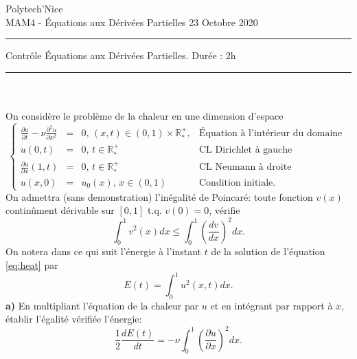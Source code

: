 \documentclass[12pt,a4paper]{article}
\begin{document}
 \hfill Polytech'Nice\\
\noindent MAM4 - \'Equations aux D\'eriv\'ees Partielles \hfill 
23 Octobre 2020 \\

\hrule

\vspace{0.6cm}
\centerline {\large \sc Contrôle \'Equations aux D\'eriv\'ees Partielles. Dur\'ee : 2h}
\vspace{0.6cm}


\hrule
\vspace{0.7cm}
\\

\\%

\noindent On consid\`ere le probl\`eme de la chaleur en une dimension
d'espace 
\begin{equation}\label{eq:heat}
\left\{\begin{array}{lcll}
\displaystyle\frac{\partial u}{\partial t} - \nu \frac{\partial^2 u}{\partial x^2}&=
&0,\,
(x,t)\in (0,1)\times\mathbb{R}_*^+, & \text{Équation à l'intérieur du domaine } \\
u(0,t)&=&0,\, t\in \mathbb{R}_*^+ &\text{CL Dirichlet à gauche}\\
\displaystyle \frac{\partial u}{\partial x}(1,t)&=&0,\, t\in \mathbb{R}_*^+ &\text{CL Neumann à droite}\\
u(x,0)&=&u_0(x),\, x\in (0,1) & \text {Condition initiale}.
\end{array}\right.
\end{equation}
On admettra (sans demonstration) l'inégalité de Poincaré:  toute fonction $v(x)$ contin\^ument d\'erivable sur
$[0,1]$ t.q. $v(0)=0$, v\'erifie 
\begin{equation}\label{eq:Poincare}
\int_0^1 v^2(x)dx \le \int_0^1\left(\frac{d v}{d
    x}\right)^2dx.
\end{equation}
On notera dans ce qui suit l'\'energie \`a l'instant $t$ de la solution de l'équation \eqref{eq:heat} par
$$
E(t) = \int_0^1 u^2(x,t)dx.
$$
{\bf a)} En multipliant l'\'equation de la
chaleur par $u$ et
en int\'egrant par rapport \`a $x$, \'etablir l'\'egalit\'e
v\'erifi\'ee l'énergie: %
$$
\frac{1}{2}\frac{dE(t)}{dt}
=-\nu\int_0^1\left(\frac{\partial u}{\partial x}\right)^2 dx.
$$
\end{document}
